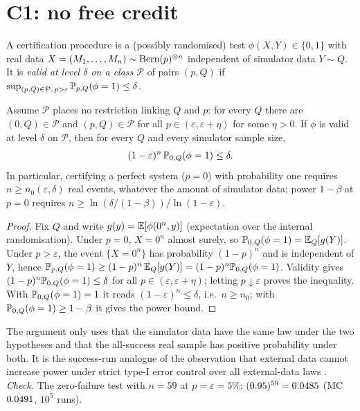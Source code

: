\section{C1: no free credit}

A certification procedure is a (possibly randomised) test $\phi(X,Y)\in\{0,1\}$ with real data
$X=(M_1,\dots,M_n)\sim\mathrm{Bern}(p)^{\otimes n}$ independent of simulator data $Y\sim Q$. It is \emph{valid at level
$\delta$ on a class $\mathcal{P}$} of pairs $(p,Q)$ if $\sup_{(p,Q)\in\mathcal{P},\,p>\varepsilon}\mathbb{P}_{p,Q}(\phi=1)\le\delta$.

\begin{theorem}[C1]\label{thm:c1}
Assume $\mathcal{P}$ places no restriction linking $Q$ and $p$: for every $Q$ there are $(0,Q)\in\mathcal{P}$ and
$(p,Q)\in\mathcal{P}$ for all $p\in(\varepsilon,\varepsilon+\eta)$ for some $\eta>0$. If $\phi$ is valid at level
$\delta$ on $\mathcal{P}$, then for every $Q$ and every simulator sample size,
\[(1-\varepsilon)^n\,\mathbb{P}_{0,Q}(\phi=1)\le\delta .\]
In particular, certifying a perfect system ($p=0$) with probability one requires $n\ge n_0(\varepsilon,\delta)$ real
events, whatever the amount of simulator data; power $1-\beta$ at $p=0$ requires
$n\ge \ln(\delta/(1-\beta))/\ln(1-\varepsilon)$.
\end{theorem}

\begin{proof}
Fix $Q$ and write $g(y)=\mathbb{E}[\phi(0^n,y)]$ (expectation over the internal randomisation). Under $p=0$, $X=0^n$ almost
surely, so $\mathbb{P}_{0,Q}(\phi=1)=\mathbb{E}_Q[g(Y)]$. Under $p>\varepsilon$, the event $\{X=0^n\}$ has probability $(1-p)^n$ and
is independent of $Y$, hence $\mathbb{P}_{p,Q}(\phi=1)\ge(1-p)^n\,\mathbb{E}_Q[g(Y)]=(1-p)^n\mathbb{P}_{0,Q}(\phi=1)$. Validity gives
$(1-p)^n\mathbb{P}_{0,Q}(\phi=1)\le\delta$ for all $p\in(\varepsilon,\varepsilon+\eta)$; letting $p\downarrow\varepsilon$
proves the inequality. With $\mathbb{P}_{0,Q}(\phi=1)=1$ it reads $(1-\varepsilon)^n\le\delta$, i.e.\ $n\ge n_0$; with
$\mathbb{P}_{0,Q}(\phi=1)\ge 1-\beta$ it gives the power bound.
\end{proof}

\begin{remark}
The argument only uses that the simulator data have the same law under the two hypotheses and that the
all-success real sample has positive probability under both. It is the success-run analogue of the observation that
external data cannot increase power under strict type-I error control over all external-data laws
\cite{koppschneider2020}.
\emph{Check.} The zero-failure test with $n=59$ at $p=\varepsilon=5\%$: $(0.95)^{59}=0.0485$ (MC
$0.0491$, $10^5$ runs).
\end{remark}

